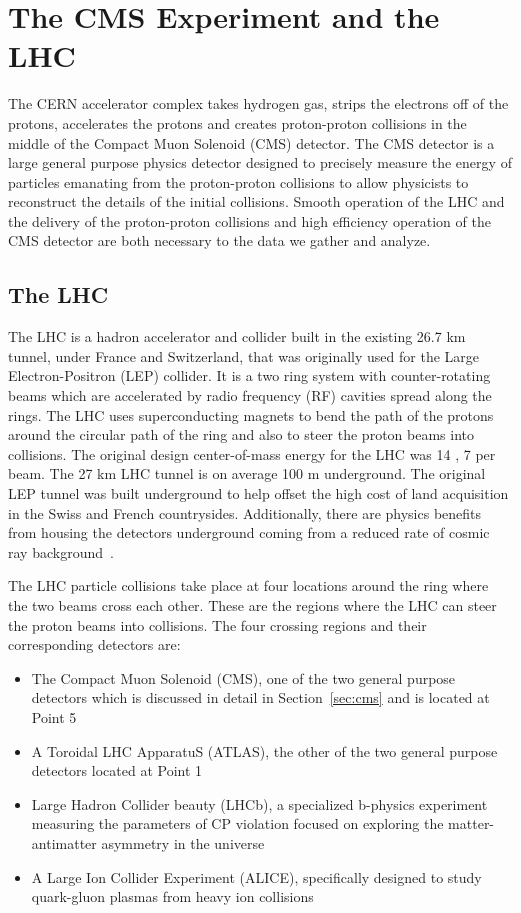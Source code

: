\chapter{The CMS Experiment and the LHC}
\label{sec:cms_lhc}
The CERN accelerator complex takes hydrogen gas, strips the electrons off of the protons,
accelerates the protons and creates proton-proton collisions in the middle of the
Compact Muon Solenoid (CMS) detector. The CMS detector is a large general purpose 
physics detector designed to precisely measure the energy of particles
emanating from the proton-proton collisions to allow physicists to reconstruct
the details of the initial collisions. Smooth operation of the LHC and the delivery
of the proton-proton collisions and high efficiency operation of the CMS detector
are both necessary to the data we gather and analyze.


\section{The LHC}
The LHC is a hadron accelerator and collider built in the existing 26.7 km tunnel,
under France and Switzerland, that was originally used for the Large Electron-Positron (LEP)
collider. It is a two ring system with counter-rotating beams which are accelerated by
radio frequency (RF) cavities spread along the rings. The LHC uses superconducting magnets to 
bend the path of the protons around the circular path of the ring and also to steer
the proton beams into collisions. The original design center-of-mass energy for the LHC
was 14 \TeV, 7 \TeV per beam. The 27 km LHC tunnel is on average 100 m underground.
The original LEP tunnel was built underground to help offset the high cost of land
acquisition in the Swiss and French countrysides. Additionally, there are physics
benefits from housing the detectors underground coming from a reduced rate of cosmic
ray background~\cite{Voss:2009zz}.

The LHC particle collisions take place at four locations around the ring where the two beams
cross each other. These are the regions where the LHC can steer the proton
beams into collisions. The four crossing regions and their corresponding detectors are:
\begin{itemize}
\item The Compact Muon Solenoid (CMS), one of the two general purpose detectors which is
discussed in detail in Section~\ref{sec:cms} and is located at Point 5
\item A Toroidal LHC ApparatuS (ATLAS), the other of the two general purpose detectors
located at Point 1
\item Large Hadron Collider beauty (LHCb), a specialized b-physics experiment measuring
the parameters of CP violation focused on exploring the matter-antimatter asymmetry
in the universe
\item A Large Ion Collider Experiment (ALICE), specifically designed to study
quark-gluon plasmas from heavy ion collisions
\end{itemize}

